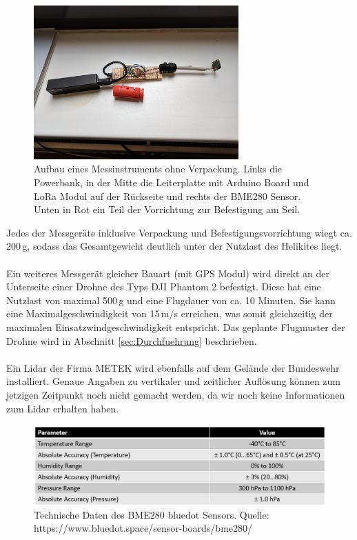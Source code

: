 \documentclass[a4paper,11pt,DIV=calc,tablecaptionabove,headinclude,twoside]{article}
\begin{document}
\begin{figure}[t]
	\centering
	\includegraphics[width=0.7\textwidth]{Slave.jpg}
	\captionsetup{width=11cm}
	\caption{Aufbau eines Messinstruments ohne Verpackung. Links die Powerbank, in der Mitte die Leiterplatte mit Arduino Board und LoRa Modul auf der Rückseite und rechts der BME280 Sensor. Unten in Rot ein Teil der Vorrichtung zur Befestigung am Seil.}
	\label{Slave}
\end{figure}
Jedes der Messgeräte inklusive Verpackung und Befestigungsvorrichtung wiegt ca. 200\,g, sodass das Gesamtgewicht deutlich unter der Nutzlast des Helikites liegt.\\\\
Ein weiteres Messgerät gleicher Bauart (mit GPS Modul) wird direkt an der Unterseite einer Drohne des Typs DJI Phantom 2 befestigt. Diese hat eine Nutzlast von maximal 500\,g und eine Flugdauer von ca. 10 Minuten. Sie kann eine Maximalgeschwindigkeit von 15\,m/s erreichen, was somit gleichzeitig der maximalen Einsatzwindgeschwindigkeit entspricht. Das geplante Flugmuster der Drohne wird in Abschnitt \ref{sec:Durchfuehrung} beschrieben. \\\\
Ein Lidar der Firma METEK wird ebenfalls auf dem Gelände der Bundeswehr installiert. Genaue Angaben zu vertikaler und zeitlicher Auflösung können zum jetzigen Zeitpunkt noch nicht gemacht werden, da wir noch keine Informationen zum Lidar erhalten haben.  
\begin{figure}[b!]
\centering
\includegraphics[width=\textwidth]{BME_280_technische_Daten.png}
\captionsetup{width=11cm}
\caption{Technische Daten des BME280 bluedot Sensors. Quelle: https://www.bluedot.space/sensor-boards/bme280/}
\label{BME_280}
\end{figure}
\end{document}
